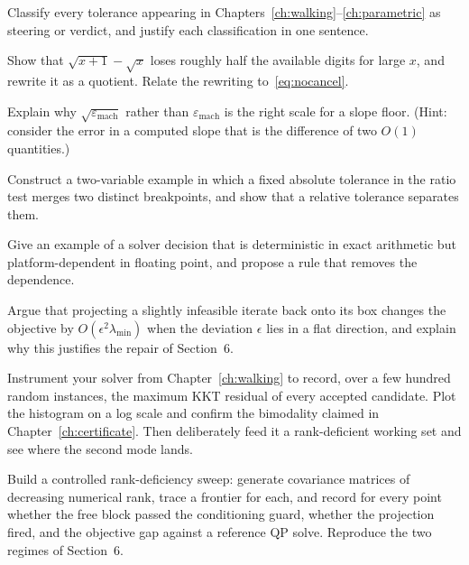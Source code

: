 \begin{exercises}

\begin{exercise}
Classify every tolerance appearing in Chapters~\ref{ch:walking}--\ref{ch:parametric} as
steering or verdict, and justify each classification in one sentence.
\end{exercise}

\begin{exercise}
Show that $\sqrt{x+1}-\sqrt{x}$ loses roughly half the available digits for large $x$,
and rewrite it as a quotient. Relate the rewriting to~\eqref{eq:nocancel}.
\end{exercise}

\begin{exercise}
Explain why $\sqrt{\varepsilon_{\mathrm{mach}}}$ rather than
$\varepsilon_{\mathrm{mach}}$ is the right scale for a slope floor. (Hint: consider the
error in a computed slope that is the difference of two $O(1)$ quantities.)
\end{exercise}

\begin{exercise}
Construct a two-variable example in which a fixed absolute tolerance in the ratio test
merges two distinct breakpoints, and show that a relative tolerance separates them.
\end{exercise}

\begin{exercise}
Give an example of a solver decision that is deterministic in exact arithmetic but
platform-dependent in floating point, and propose a rule that removes the dependence.
\end{exercise}

\begin{exercise}
Argue that projecting a slightly infeasible iterate back onto its box changes the
objective by $O(\epsilon^2\lambda_{\min})$ when the deviation $\epsilon$ lies in a flat
direction, and explain why this justifies the repair of Section~6.
\end{exercise}

\begin{exercise}[Implementation]
Instrument your solver from Chapter~\ref{ch:walking} to record, over a few hundred
random instances, the maximum KKT residual of every accepted candidate. Plot the
histogram on a log scale and confirm the bimodality claimed in
Chapter~\ref{ch:certificate}. Then deliberately feed it a rank-deficient working set and
see where the second mode lands.
\end{exercise}

\begin{exercise}[Implementation]
Build a controlled rank-deficiency sweep: generate covariance matrices of decreasing
numerical rank, trace a frontier for each, and record for every point whether the free
block passed the conditioning guard, whether the projection fired, and the objective gap
against a reference QP solve. Reproduce the two regimes of Section~6.
\end{exercise}

\end{exercises}
